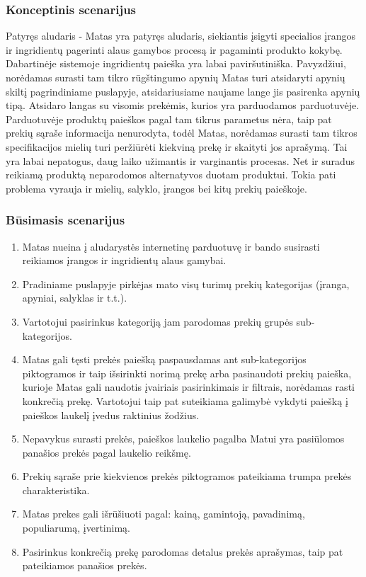 \documentclass[oneside]{VUMIFPSkursinis}
\begin{document}
		\subsubsection{Konceptinis scenarijus}
			Patyręs aludaris - Matas yra patyręs aludaris, siekiantis įsigyti specialios įrangos ir ingridientų pagerinti alaus gamybos procesą ir pagaminti produkto kokybę.
			Dabartinėje sistemoje ingridientų paieška yra labai paviršutiniška.
			Pavyzdžiui, norėdamas surasti tam tikro rūgštingumo apynių Matas turi atsidaryti apynių skiltį pagrindiniame puslapyje, atsidariusiame naujame lange jis pasirenka apynių tipą.
			Atsidaro langas su visomis prekėmis, kurios yra parduodamos parduotuvėje.
			Parduotuvėje produktų paieškos pagal tam tikrus parametus nėra, taip pat prekių sąraše informacija nenurodyta, todėl Matas, norėdamas surasti tam tikros specifikacijos mielių turi peržiūrėti kiekviną prekę ir skaityti jos aprašymą.
			Tai yra labai nepatogus, daug laiko užimantis ir varginantis procesas.
			Net ir suradus reikiamą produktą neparodomos alternatyvos duotam produktui.
			Tokia pati problema vyrauja ir mielių, salyklo, įrangos bei kitų prekių paieškoje.
		\subsubsection{Būsimasis scenarijus}
			\begin{enumerate}
				\item{Matas nueina į aludarystės internetinę parduotuvę ir bando susirasti reikiamos įrangos ir ingridientų alaus gamybai.}
				\item{Pradiniame puslapyje pirkėjas mato visų turimų prekių kategorijas (įranga, apyniai, salyklas ir t.t.).}
				\item{Vartotojui pasirinkus kategoriją jam parodomas prekių grupės sub-kategorijos.}
				\item{Matas gali tęsti prekės paiešką paspausdamas ant sub-kategorijos piktogramos ir taip išsirinkti norimą prekę arba pasinaudoti prekių paieška, kurioje Matas gali naudotis įvairiais  pasirinkimais ir filtrais, norėdamas rasti konkrečią prekę. Vartotojui taip pat suteikiama galimybė vykdyti paiešką į paieškos laukelį įvedus raktinius žodžius.}
				\item{Nepavykus surasti prekės, paieškos laukelio pagalba Matui yra pasiūlomos panašios prekės pagal laukelio reikšmę.}
				\item{Prekių sąraše prie kiekvienos prekės piktogramos pateikiama trumpa prekės charakteristika. }
				\item{Matas prekes gali išrūšiuoti pagal: kainą, gamintoją, pavadinimą, populiarumą, įvertinimą.}
				\item{Pasirinkus konkrečią prekę parodomas detalus prekės aprašymas, taip pat pateikiamos panašios prekės.}
			\end{enumerate}
\end{document}
